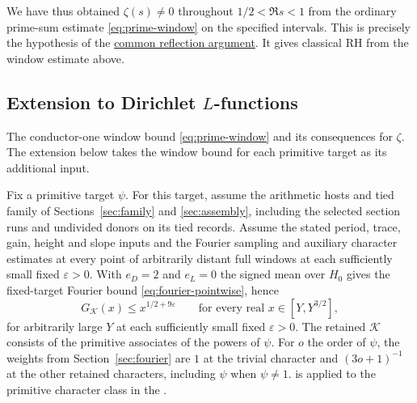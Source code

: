 We have thus obtained \(\zeta(s)\ne0\) throughout \(1/2<\Re s<1\)
from the ordinary prime-sum estimate \eqref{eq:prime-window} on the
specified intervals. This is precisely the hypothesis of the
\hyperlink{proof.zeta-reflection}{common reflection argument}.
It gives classical RH from the window estimate above.

\subsection{Extension to Dirichlet \texorpdfstring{\(L\)}{L}-functions}

{The conductor-one window bound \eqref{eq:prime-window} and its
consequences for \(\zeta\). The extension below takes the window
bound for each primitive target as its additional input.}

Fix a primitive target \(\psi\). For this target, assume the arithmetic
hosts and tied family of Sections~\ref{sec:family} and \ref{sec:assembly},
including the selected section runs and undivided donors on its tied
records. Assume the stated period, trace, gain, height and slope
inputs and the Fourier sampling and auxiliary character estimates
at every point of arbitrarily distant full windows at each sufficiently
small fixed \(\varepsilon>0\). With \(e_D=2\) and \(e_L=0\) the
signed mean over \(H_0\) gives the fixed-target Fourier bound
\eqref{eq:fourier-pointwise}, hence
\begin{equation}
\label{eq:primitive-target-window}
 G_{\mathcal K}(x)\le x^{1/2+9\varepsilon}
  \qquad\text{for every real }x\in[Y,Y^{3/2}],
\end{equation}
for arbitrarily large \(Y\) at each sufficiently small fixed
\(\varepsilon>0\). The retained \(\mathcal K\) consists of the
primitive associates of the powers of \(\psi\). For \(o\) the order
of \(\psi\), the weights from Section~\ref{sec:fourier} are \(1\)
at the trivial character and \((3o+1)^{-1}\) at the other retained
characters, including \(\psi\) when \(\psi\ne1\).
is applied to the primitive character class in the
.

